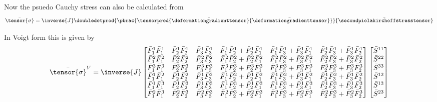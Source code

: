 Now the psuedo Cauchy stress can also be calculated from
\begin{equation}
  \bar{\tensor{\sigma}}=\inverse{J}\doubledotprod{\pbrac{\tensorprod{\bar{\deformationgradienttensor}}{\bar{\deformationgradienttensor}}}}{\bar{\secondpiolakirchoffstresstensor}}\\
\end{equation}

In Voigt form this is given by
\begin{equation}
  \bar{\tensor{\sigma}}^{V}=\inverse{J}\begin{bmatrix}
  \bar{F}_{1}^{1}\bar{F}_{1}^{1} & \bar{F}_{2}^{1}\bar{F}_{2}^{1} & \bar{F}_{3}^{1}\bar{F}_{3}^{1} &
  \bar{F}_{1}^{1}\bar{F}_{2}^{1} + \bar{F}_{2}^{1}\bar{F}_{1}^{1} &
  \bar{F}_{1}^{1}\bar{F}_{3}^{1} + \bar{F}_{3}^{1}\bar{F}_{1}^{1} &
  \bar{F}_{2}^{1}\bar{F}_{3}^{1} + \bar{F}_{3}^{1}\bar{F}_{2}^{1} \\
  \bar{F}_{1}^{2}\bar{F}_{1}^{2} & \bar{F}_{2}^{2}\bar{F}_{2}^{2} & \bar{F}_{3}^{2}\bar{F}_{3}^{2} &
  \bar{F}_{1}^{2}\bar{F}_{2}^{2} + \bar{F}_{2}^{2}\bar{F}_{1}^{2} &
  \bar{F}_{1}^{2}\bar{F}_{3}^{2} + \bar{F}_{3}^{2}\bar{F}_{1}^{2} &
  \bar{F}_{2}^{2}\bar{F}_{3}^{2} + \bar{F}_{3}^{2}\bar{F}_{2}^{2} \\
  \bar{F}_{1}^{3}\bar{F}_{1}^{3} & \bar{F}_{2}^{3}\bar{F}_{2}^{3} & \bar{F}_{3}^{3}\bar{F}_{3}^{3} &
  \bar{F}_{1}^{3}\bar{F}_{2}^{3} + \bar{F}_{2}^{3}\bar{F}_{1}^{3} &
  \bar{F}_{1}^{3}\bar{F}_{3}^{3} + \bar{F}_{3}^{3}\bar{F}_{1}^{3} &
  \bar{F}_{2}^{3}\bar{F}_{3}^{3} + \bar{F}_{3}^{3}\bar{F}_{2}^{3} \\
  \bar{F}_{1}^{1}\bar{F}_{1}^{2} & \bar{F}_{2}^{1}\bar{F}_{2}^{2} & \bar{F}_{3}^{1}\bar{F}_{3}^{2} &
  \bar{F}_{1}^{1}\bar{F}_{2}^{2} + \bar{F}_{2}^{1}\bar{F}_{1}^{2} &
  \bar{F}_{1}^{1}\bar{F}_{3}^{2} + \bar{F}_{3}^{1}\bar{F}_{1}^{2} &
  \bar{F}_{2}^{1}\bar{F}_{3}^{2} + \bar{F}_{3}^{1}\bar{F}_{2}^{2} \\
  \bar{F}_{1}^{1}\bar{F}_{1}^{3} & \bar{F}_{2}^{1}\bar{F}_{2}^{3} & \bar{F}_{3}^{1}\bar{F}_{3}^{3} &
  \bar{F}_{1}^{1}\bar{F}_{2}^{3} + \bar{F}_{2}^{1}\bar{F}_{1}^{3} &
  \bar{F}_{1}^{1}\bar{F}_{3}^{3} + \bar{F}_{3}^{1}\bar{F}_{1}^{3} &
  \bar{F}_{2}^{1}\bar{F}_{3}^{3} + \bar{F}_{3}^{1}\bar{F}_{2}^{3} \\
  \bar{F}_{1}^{2}\bar{F}_{1}^{3} & \bar{F}_{2}^{2}\bar{F}_{2}^{3} & \bar{F}_{3}^{2}\bar{F}_{3}^{3} &
  \bar{F}_{1}^{2}\bar{F}_{2}^{3} + \bar{F}_{2}^{2}\bar{F}_{1}^{3} &
  \bar{F}_{1}^{2}\bar{F}_{3}^{3} + \bar{F}_{3}^{2}\bar{F}_{1}^{3} &
  \bar{F}_{2}^{2}\bar{F}_{3}^{3} + \bar{F}_{3}^{2}\bar{F}_{2}^{3} 
  \end{bmatrix}\begin{bmatrix}
    \bar{S}^{11} \\
    \bar{S}^{22} \\
    \bar{S}^{33} \\
    \bar{S}^{12} \\
    \bar{S}^{13} \\
    \bar{S}^{23}
  \end{bmatrix}
\end{equation}

